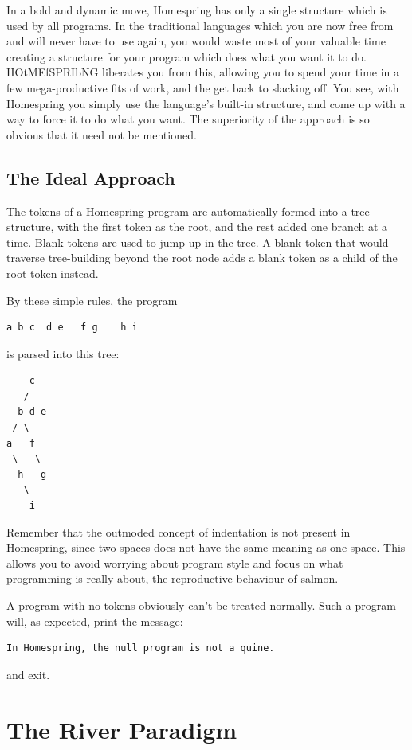 \documentclass[10pt]{article}
\begin{document}
In a bold and dynamic move, Homespring has only a single structure which is used by all programs. In the traditional languages which you are now free from and will never have to use again, you would waste most of your valuable time creating a structure for your program which does what you want it to do. HOtMEfSPRIbNG liberates you from this, allowing you to spend your time in a few mega-productive fits of work, and the get back to slacking off. You see, with Homespring you simply use the language's built-in structure, and come up with a way to force it to do what you want. The superiority of the approach is so obvious that it need not be mentioned.

\subsection{The Ideal Approach}

The tokens of a Homespring program are automatically formed into a tree structure, with the first token as the root, and the rest added one branch at a time.
Blank tokens are used to jump up in the tree.
A blank token that would traverse tree-building beyond the root node adds a blank token as a child of the root token instead.

By these simple rules, the program
\begin{verbatim}
a b c  d e   f g    h i
\end{verbatim}
is parsed into this tree:

\begin{verbatim}
    c
   /
  b-d-e
 / \
a   f
 \   \
  h   g
   \
    i
\end{verbatim}

Remember that the outmoded concept of indentation is not present in Homespring, since two spaces does not have the same meaning as one space. This allows you to avoid worrying about program style and focus on what programming is really about, the reproductive behaviour of salmon.

A program with no tokens obviously can't be treated normally. Such a program will, as expected, print the message:
\begin{verbatim}
In Homespring, the null program is not a quine.
\end{verbatim}
and exit.

\section{The River Paradigm}
\end{document}
